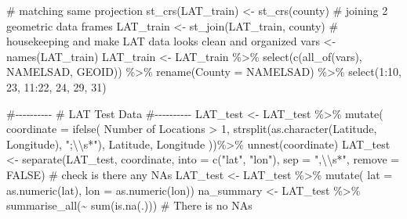 \documentclass[
  letterpaper,
  DIV=11,
  numbers=noendperiod]{scrartcl}
\newenvironment{Shaded}{\begin{snugshade}}{\end{snugshade}}
\newcommand{\AttributeTok}[1]{\textcolor[rgb]{0.40,0.45,0.13}{#1}}
\newcommand{\CommentTok}[1]{\textcolor[rgb]{0.37,0.37,0.37}{#1}}
\newcommand{\ConstantTok}[1]{\textcolor[rgb]{0.56,0.35,0.01}{#1}}
\newcommand{\DecValTok}[1]{\textcolor[rgb]{0.68,0.00,0.00}{#1}}
\newcommand{\FunctionTok}[1]{\textcolor[rgb]{0.28,0.35,0.67}{#1}}
\newcommand{\NormalTok}[1]{\textcolor[rgb]{0.00,0.23,0.31}{#1}}
\newcommand{\OtherTok}[1]{\textcolor[rgb]{0.00,0.23,0.31}{#1}}
\newcommand{\SpecialCharTok}[1]{\textcolor[rgb]{0.37,0.37,0.37}{#1}}
\newcommand{\StringTok}[1]{\textcolor[rgb]{0.13,0.47,0.30}{#1}}
\begin{document}
\begin{Shaded}
\begin{Highlighting}[]
\CommentTok{\# matching same projection}
\FunctionTok{st\_crs}\NormalTok{(LAT\_train) }\OtherTok{\textless{}{-}} \FunctionTok{st\_crs}\NormalTok{(county)}
\CommentTok{\# joining 2 geometric data frames}
\NormalTok{LAT\_train }\OtherTok{\textless{}{-}} \FunctionTok{st\_join}\NormalTok{(LAT\_train, county)}
\CommentTok{\# housekeeping and make LAT data looks clean and organized}
\NormalTok{vars }\OtherTok{\textless{}{-}} \FunctionTok{names}\NormalTok{(LAT\_train)}
\NormalTok{LAT\_train }\OtherTok{\textless{}{-}}\NormalTok{ LAT\_train }\SpecialCharTok{\%\textgreater{}\%}
  \FunctionTok{select}\NormalTok{(}\FunctionTok{c}\NormalTok{(}\FunctionTok{all\_of}\NormalTok{(vars), NAMELSAD, GEOID)) }\SpecialCharTok{\%\textgreater{}\%}
  \FunctionTok{rename}\NormalTok{(}\AttributeTok{County =}\NormalTok{ NAMELSAD) }\SpecialCharTok{\%\textgreater{}\%}
  \FunctionTok{select}\NormalTok{(}\DecValTok{1}\SpecialCharTok{:}\DecValTok{10}\NormalTok{, }\DecValTok{23}\NormalTok{, }\DecValTok{11}\SpecialCharTok{:}\DecValTok{22}\NormalTok{, }\DecValTok{24}\NormalTok{, }\DecValTok{29}\NormalTok{, }\DecValTok{31}\NormalTok{)}

\CommentTok{\#{-}{-}{-}{-}{-}{-}{-}{-}{-}{-}}
\CommentTok{\# LAT Test Data}
\CommentTok{\#{-}{-}{-}{-}{-}{-}{-}{-}{-}{-}}
\NormalTok{LAT\_test }\OtherTok{\textless{}{-}}\NormalTok{ LAT\_test }\SpecialCharTok{\%\textgreater{}\%}
  \FunctionTok{mutate}\NormalTok{(}
    \AttributeTok{coordinate =} \FunctionTok{ifelse}\NormalTok{(}
      \StringTok{\textasciigrave{}}\AttributeTok{Number of Locations}\StringTok{\textasciigrave{}} \SpecialCharTok{\textgreater{}} \DecValTok{1}\NormalTok{,}
      \FunctionTok{strsplit}\NormalTok{(}\FunctionTok{as.character}\NormalTok{(}\StringTok{\textasciigrave{}}\AttributeTok{Latitude, Longitude}\StringTok{\textasciigrave{}}\NormalTok{), }\StringTok{";}\SpecialCharTok{\textbackslash{}\textbackslash{}}\StringTok{s*"}\NormalTok{),}
      \StringTok{\textasciigrave{}}\AttributeTok{Latitude, Longitude}\StringTok{\textasciigrave{}}
\NormalTok{    ))}\SpecialCharTok{\%\textgreater{}\%}  
  \FunctionTok{unnest}\NormalTok{(coordinate)}
\NormalTok{LAT\_test }\OtherTok{\textless{}{-}} \FunctionTok{separate}\NormalTok{(LAT\_test, coordinate, }\AttributeTok{into =} \FunctionTok{c}\NormalTok{(}\StringTok{"lat"}\NormalTok{, }\StringTok{"lon"}\NormalTok{), }
                 \AttributeTok{sep =} \StringTok{",}\SpecialCharTok{\textbackslash{}\textbackslash{}}\StringTok{s*"}\NormalTok{, }\AttributeTok{remove =} \ConstantTok{FALSE}\NormalTok{)}
\CommentTok{\# check is there any NAs }
\NormalTok{LAT\_test }\OtherTok{\textless{}{-}}\NormalTok{ LAT\_test }\SpecialCharTok{\%\textgreater{}\%}
  \FunctionTok{mutate}\NormalTok{(}
    \AttributeTok{lat =} \FunctionTok{as.numeric}\NormalTok{(lat),}
    \AttributeTok{lon =} \FunctionTok{as.numeric}\NormalTok{(lon))}
\NormalTok{na\_summary }\OtherTok{\textless{}{-}}\NormalTok{ LAT\_test }\SpecialCharTok{\%\textgreater{}\%}
  \FunctionTok{summarise\_all}\NormalTok{(}\SpecialCharTok{\textasciitilde{}} \FunctionTok{sum}\NormalTok{(}\FunctionTok{is.na}\NormalTok{(.))) }\CommentTok{\# There is no NAs}


\end{Highlighting}
\end{Shaded}
\end{document}
